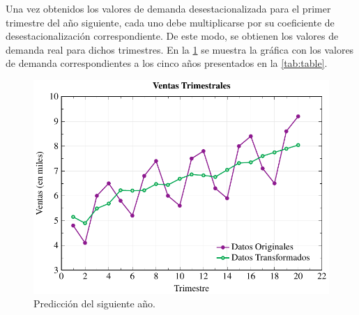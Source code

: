 Una vez obtenidos los valores de demanda desestacionalizada para el primer
trimestre del año siguiente, cada uno debe multiplicarse por su coeficiente de
desestacionalización correspondiente.
De este modo, se obtienen los valores de demanda real para dichos trimestres.
En la \cref{fig:prediction} se muestra la gráfica con los valores de demanda
correspondientes a los cinco años presentados en la \cref{tab:table}.

\begin{figure}[htpb!]
  \centering
  \includegraphics[width=\columnwidth]{../Figures/prediction-data.pdf}
  \caption{Predicción del siguiente año.}
  \label{fig:prediction}
\end{figure}


